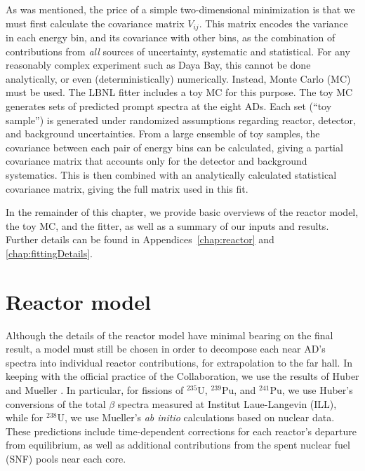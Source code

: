 \documentclass[../thesis.tex]{subfiles}
\begin{document}
As was mentioned, the price of a simple two-dimensional minimization is that we must first calculate the covariance matrix $V_{ij}$. This matrix encodes the variance in each energy bin, and its covariance with other bins, as the combination of contributions from \emph{all} sources of uncertainty, systematic and statistical. For any reasonably complex experiment such as Daya Bay, this cannot be done analytically, or even (deterministically) numerically. Instead, Monte Carlo (MC) must be used. The LBNL fitter includes a toy MC for this purpose. The toy MC generates sets of predicted prompt spectra at the eight ADs. Each set (``toy sample'') is generated under randomized assumptions regarding reactor, detector, and background uncertainties. From a large ensemble of toy samples, the covariance between each pair of energy bins can be calculated, giving a partial covariance matrix that accounts only for the detector and background systematics. This is then combined with an analytically calculated statistical covariance matrix, giving the full matrix used in this fit.

In the remainder of this chapter, we provide basic overviews of the reactor model, the toy MC, and the fitter, as well as a summary of our inputs and results. Further details can be found in Appendices~\ref{chap:reactor} and \ref{chap:fittingDetails}.

\section{Reactor model}
\label{sec:fittingReactor}

Although the details of the reactor model have minimal bearing on the final result, a model must still be chosen in order to decompose each near AD's spectra into individual reactor contributions, for extrapolation to the far hall. In keeping with the official practice of the Collaboration, we use the results of Huber \cite{PhysRevC.84.024617} and Mueller \cite{PhysRevC.83.054615}. In particular, for fissions of $^{235}$U, $^{239}$Pu, and $^{241}$Pu, we use Huber's conversions of the total $\beta$ spectra measured at Institut Laue-Langevin (ILL), while for $^{238}$U, we use Mueller's \emph{ab initio} calculations based on nuclear data. These predictions include time-dependent corrections for each reactor's departure from equilibrium, as well as additional contributions from the spent nuclear fuel (SNF) pools near each core.
\end{document}
